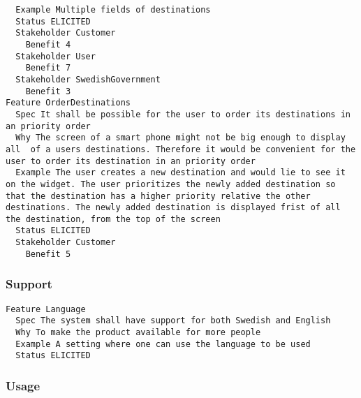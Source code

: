 \begin{lstlisting}
  Example Multiple fields of destinations
  Status ELICITED
  Stakeholder Customer
    Benefit 4
  Stakeholder User
    Benefit 7
  Stakeholder SwedishGovernment
    Benefit 3
Feature OrderDestinations
  Spec It shall be possible for the user to order its destinations in an priority order
  Why The screen of a smart phone might not be big enough to display all  of a users destinations. Therefore it would be convenient for the user to order its destination in an priority order
  Example The user creates a new destination and would lie to see it on the widget. The user prioritizes the newly added destination so that the destination has a higher priority relative the other destinations. The newly added destination is displayed frist of all the destination, from the top of the screen
  Status ELICITED
  Stakeholder Customer
    Benefit 5

\end{lstlisting}
    
        
       \subsubsection{Support}


\begin{lstlisting}
Feature Language
  Spec The system shall have support for both Swedish and English
  Why To make the product available for more people
  Example A setting where one can use the language to be used
  Status ELICITED

\end{lstlisting}
    
        
       \subsubsection{Usage}


